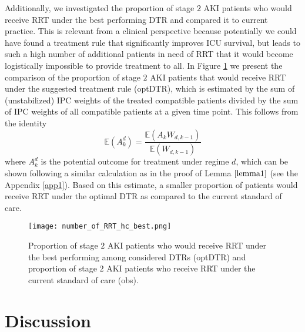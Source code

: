 \documentclass[12pt]{article}
\begin{document}
\indent
Additionally, we investigated the proportion of stage $2$ AKI patients who would receive RRT under the best performing DTR and compared it to current practice. This is relevant from a clinical perspective because potentially we could have found a treatment rule that significantly improves ICU survival, but leads to such a high number of additional patients in need of RRT that it would become logistically impossible to provide treatment to all. In Figure \ref{figure4} we present the comparison of the proportion of stage $2$ AKI patients that would receive RRT under the suggested treatment rule (optDTR), which is estimated by the sum of (unstabilized) IPC weights of the treated compatible patients divided by the sum of IPC weights of all compatible patients at a given time point. This follows from the identity
\begin{equation*}
\mathbb{E} \left( A_{k}^d \right) = \frac{\mathbb{E} \left( A_{k} W_{d,k-1} \right)}{\mathbb{E} \left( W_{d,k-1} \right)}
\end{equation*}
where $A_k^d$ is the potential outcome for treatment under regime $d$, which can be shown following a similar calculation as in the proof of Lemma $\ref{lemma1}$ (see the Appendix \ref{app1}). Based on this estimate, a smaller proportion of patients would receive RRT under the optimal DTR as compared to the current standard of care. 
\begin{figure}[H]
\begin{center}
\texttt{[image: number\_of\_RRT\_hc\_best.png]}
\end{center}
\caption{Proportion of stage $2$ AKI patients who would receive RRT under the best performing among considered DTRs (optDTR) and proportion of stage $2$ AKI patients who receive RRT under the current standard of care (obs).\label{figure4}}
\label{figure4}
\end{figure}

\section{Discussion}\label{sec6}
\end{document}
